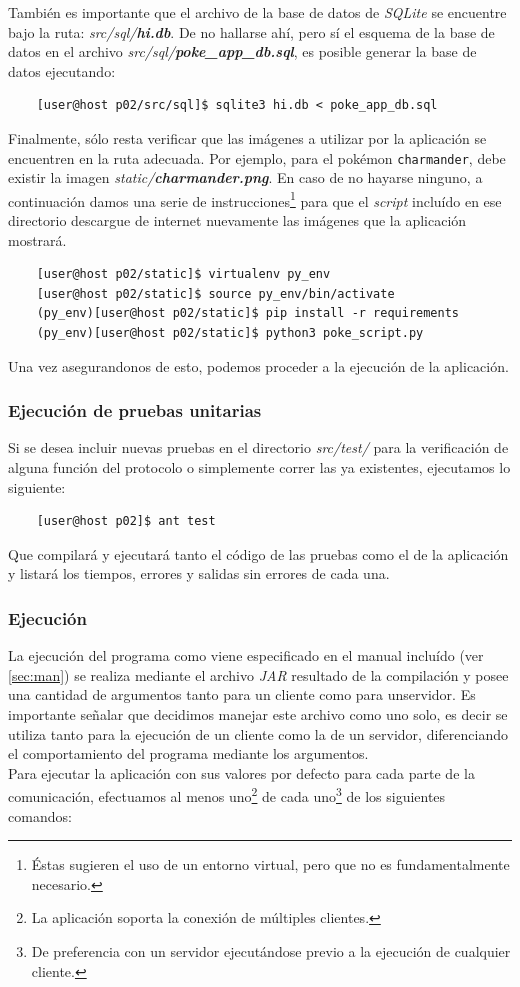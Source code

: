 \documentclass[12pt]{article}
\begin{document}
También es importante que el archivo de la base de datos de \textit{SQLite} se encuentre bajo la ruta:
\textit{src/sql/\textbf{hi.db}}. De no hallarse ahí, pero sí el esquema de la base de datos en el archivo \textit{src/sql/\textbf{poke\_app\_db.sql}}, es posible generar la base de datos ejecutando:
\begin{verbatim}
    [user@host p02/src/sql]$ sqlite3 hi.db < poke_app_db.sql
\end{verbatim}

Finalmente, sólo resta verificar que las imágenes a utilizar por la aplicación se encuentren en la ruta adecuada. Por ejemplo, para el pokémon \texttt{charmander}, debe existir la imagen \textit{static/\textbf{charmander.png}}. En caso de no hayarse ninguno, a continuación damos una serie de instrucciones\footnote{Éstas sugieren el uso de un entorno virtual, pero que no es fundamentalmente necesario.} para que el \textit{script} incluído en ese directorio descargue de internet nuevamente las imágenes que la aplicación mostrará.
\begin{verbatim}
    [user@host p02/static]$ virtualenv py_env
    [user@host p02/static]$ source py_env/bin/activate    
    (py_env)[user@host p02/static]$ pip install -r requirements
    (py_env)[user@host p02/static]$ python3 poke_script.py
\end{verbatim}

Una vez asegurandonos de esto, podemos proceder a la ejecución de la aplicación.

\subsubsection{Ejecución de pruebas unitarias}
Si se desea incluir nuevas pruebas en el directorio \textit{src/test/} para la verificación de alguna función del protocolo o simplemente correr las ya existentes, ejecutamos lo siguiente:
\begin{verbatim}
    [user@host p02]$ ant test
\end{verbatim}
Que compilará y ejecutará tanto el código de las pruebas como el de la aplicación y listará los tiempos, errores y salidas sin errores de cada una.
\subsubsection{Ejecución}\label{sec:exec}
La ejecución del programa como viene especificado en el manual incluído (ver \ref{sec:man}) se realiza mediante el archivo \textit{JAR} resultado de la compilación y posee una cantidad de argumentos tanto para un cliente como para unservidor. Es importante señalar que decidimos manejar este archivo como uno solo, es decir se utiliza tanto para la ejecución de un cliente como la de un servidor, diferenciando el comportamiento del programa mediante los argumentos. \\
Para ejecutar la aplicación con sus valores por defecto para cada parte de la comunicación, efectuamos al menos uno\footnote{La aplicación soporta la conexión de múltiples clientes.} de cada uno\footnote{De preferencia con un servidor ejecutándose previo a la ejecución de cualquier cliente.} de los siguientes comandos:\\
\end{document}
